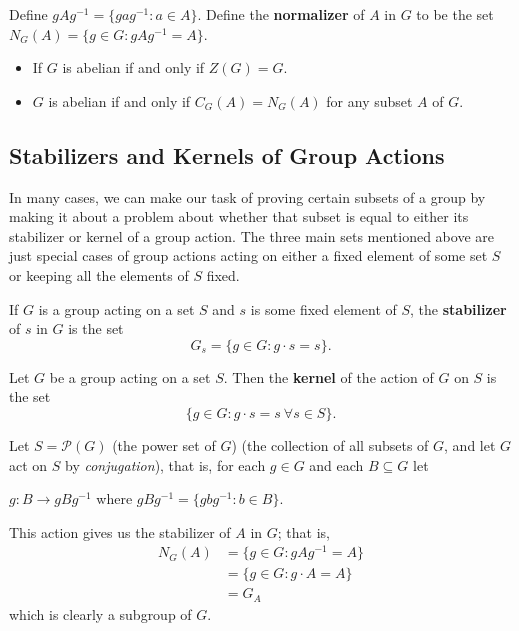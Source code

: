 \begin{definition}[Normalizer]
    Define \( g A g^{-1} = \{ g a g^{-1} : a \in A \}  \). Define the \textbf{normalizer} of \( A  \) in \( G  \) to be the set \( {N}_{G}(A) = \{ g \in G : g A g^{-1} = A  \}  \).
\end{definition}

\begin{itemize}
    \item If \( G \) is abelian if and only if \( Z(G) = G  \).
    \item \( G  \) is abelian if and only if \( {C}_{G}(A) = {N}_{G}(A) \) for any subset \( A  \) of \( G  \).
\end{itemize}

\subsection{Stabilizers and Kernels of Group Actions}

In many cases, we can make our task of proving certain subsets of a group by making it about a problem about whether that subset is equal to either its stabilizer or kernel of a group action. The three main sets mentioned above are just special cases of group actions acting on either a fixed element of some set \( S  \) or keeping all the elements of \( S  \) fixed.


\begin{definition}[Stablizer]
   If \( G  \) is a group acting on a set \( S  \) and \( s  \) is some fixed element of \( S  \), the \textbf{stabilizer} of \( s  \) in \( G  \) is the set  
   \[  {G}_{s} = \{  g \in G : g \cdot s = s  \}. \]
\end{definition}

\begin{definition}[Kernel]
   Let \( G  \) be a group acting on a set \( S  \). Then the \textbf{kernel} of the action of \( G  \) on \( S  \) is the set
   \[  \{ g \in G : g \cdot s = s \ \forall s \in S   \}.  \]
\end{definition}

Let \( S = \mathcal{P}(G) \) (the power set of \( G  \)) (the collection of all subsets of \( G  \), and let \( G  \) act on \( S  \) by \textit{conjugation}), that is, for each \( g \in G  \) and each \( B \subseteq  G  \) let
\begin{center}
\(  g : B \to g B g^{-1} \) where \( g B g^{-1} = \{  g b g^{-1} : b \in B  \}  \).
\end{center}
This action gives us the stabilizer of \( A  \) in \( G  \); that is,
\begin{align*}
    {N}_{G}(A) &= \{ g \in G : g A g^{-1} = A  \}  \\
               &= \{ g \in G : g \cdot A = A  \} \\
               &= {G}_{A} 
\end{align*}
which is clearly a subgroup of \( G  \).
